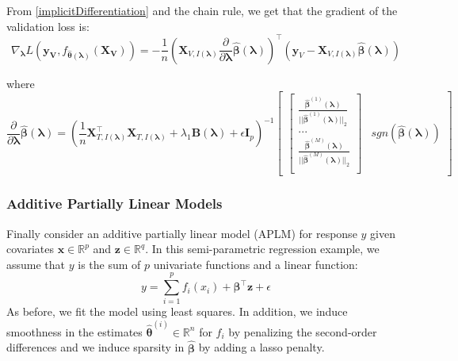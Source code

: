 \documentclass{statsoc}
\begin{document}
From \eqref{implicitDifferentiation} and the chain rule, we get that the gradient of the validation loss is:
\begin{equation}
\nabla_{\boldsymbol \lambda} L(\boldsymbol{y_V}, f_{\hat{\boldsymbol{\theta}}(\boldsymbol{\lambda})}(\boldsymbol{X_V})) =
- \frac{1}{n}
\left (
\boldsymbol{X}_{V, I(\boldsymbol\lambda)}
\frac{\partial}{\partial \boldsymbol\lambda} \hat{\boldsymbol{\beta}}(\boldsymbol{\lambda})
\right )^\top
\left (
\boldsymbol{y}_V - \boldsymbol{X}_{V, I(\boldsymbol\lambda)} \hat{\boldsymbol{\beta}}(\boldsymbol{\lambda})
\right )
\end{equation}

where 
\begin{equation}
\frac{\partial}{\partial \boldsymbol \lambda} \hat{\boldsymbol{\beta}}(\boldsymbol{\lambda})
=
\left (
\frac{1}{n} \boldsymbol{X}_{T, I(\boldsymbol\lambda)}^\top \boldsymbol{X}_{T, I(\boldsymbol\lambda)}
+ \lambda_1 \boldsymbol{B}(\boldsymbol\lambda)
+ \epsilon \boldsymbol I_p
\right ) ^{-1}
\begin{bmatrix}
\begin{bmatrix}
\frac{\hat{\boldsymbol{\beta}}^{(1)}(\boldsymbol \lambda)}{||\hat{\boldsymbol{\beta}}^{(1)} (\boldsymbol \lambda)||_2}\\
...\\
\frac{\hat{\boldsymbol \beta}^{(M)} (\boldsymbol \lambda)}{||\hat{\boldsymbol{\beta}}^{(M)}(\boldsymbol \lambda)||_2}\\
\end{bmatrix}
&
sgn(\hat{\boldsymbol{\beta}}(\boldsymbol{\lambda}))
\end{bmatrix}
\end{equation}

\subsubsection{Additive Partially Linear Models}\label{sec:additive}

Finally consider an additive partially linear model (APLM) for response $y$ given covariates $\boldsymbol{x} \in \mathbb{R}^p$ and $\boldsymbol{z} \in \mathbb{R}^q$. In this semi-parametric regression example, we assume that $y$ is the sum of $p$ univariate functions and a linear function:
\begin{equation}
y = \sum_{i=1}^p f_i(x_i) + \boldsymbol{\beta}^\top \boldsymbol z  + \epsilon
\end{equation}
As before, we fit the model using least squares. In addition, we induce smoothness in the estimates $\hat{\boldsymbol{\theta}}^{(i)} \in \mathbb{R}^n$ for $f_i$ by penalizing the second-order differences and we induce sparsity in $\hat{\boldsymbol{\beta}}$ by adding a lasso penalty.
\end{document}
